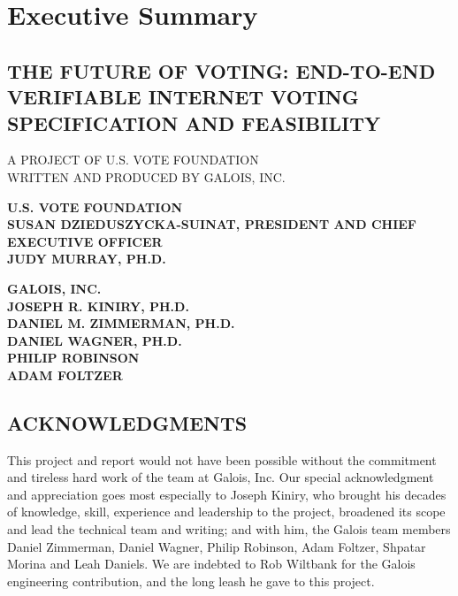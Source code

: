 \chapter*{Executive Summary}
\label{chapter:executive_summary}

\section*{THE FUTURE OF VOTING: END-TO-END VERIFIABLE INTERNET VOTING
  SPECIFICATION AND FEASIBILITY}

\noindent A PROJECT OF U.S. VOTE FOUNDATION \\
\noindent WRITTEN AND PRODUCED BY GALOIS, INC.\\

\newpage

\noindent \textbf{U.S. VOTE FOUNDATION}\\
\noindent \textbf{SUSAN DZIEDUSZYCKA-SUINAT, PRESIDENT AND CHIEF
  EXECUTIVE OFFICER}\\
\noindent \textbf{JUDY MURRAY, PH.D.}\\

\vspace{1cm}

\noindent \textbf{GALOIS, INC.}\\
\noindent \textbf{JOSEPH R. KINIRY, PH.D. }\\
\noindent \textbf{DANIEL M. ZIMMERMAN, PH.D. }\\
\noindent \textbf{DANIEL WAGNER, PH.D. }\\
\noindent \textbf{PHILIP ROBINSON}\\
\noindent \textbf{ADAM FOLTZER}\\

\section*{ACKNOWLEDGMENTS}

This project and report would not have been possible without the
commitment and tireless hard work of the team at Galois, Inc. Our
special acknowledgment and appreciation goes most especially to
Joseph Kiniry, who brought his decades of knowledge, skill, experience
and leadership to the project, broadened its scope and lead the
technical team and writing; and with him, the Galois team members
Daniel Zimmerman, Daniel Wagner, Philip Robinson, Adam Foltzer,
Shpatar Morina and Leah Daniels. We are indebted to Rob Wiltbank for
the Galois engineering contribution, and the long leash he gave to
this project. 

